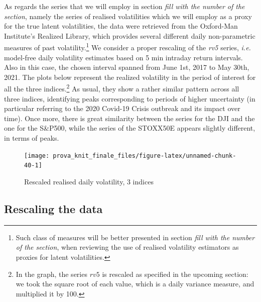 \documentclass[
]{book}
\theoremstyle{break}
\theoremstyle{nonumberplain}
\begin{document}
As regards the series that we will employ in section
\textit{fill with the number of the section}, namely the series of
realised volatilities which we will employ as a proxy for the true
latent volatilities, the data were retrieved from the Oxford-Man
Institute's Realized Library, which provides several different daily
non-parametric measures of past
volatility.\footnote{Such class of measures will be better presented in section \textit{fill with the number of the section}, when reviewing the use of realised volatility estimators as proxies for latent volatilities.}
We consider a proper rescaling of the \textit{rv5} series, \textit{i.e.}
model-free daily volatility estimates based on 5 min intraday return
intervals. Also in this case, the chosen interval spanned from June 1st,
2017 to May 30th, 2021. The plots below represent the realized
volatility in the period of interest for all the three
indices.\footnote{In the graph, the series $rv5$ is rescaled as specified in the upcoming section: we took the square root of each value, which is a daily variance measure, and multiplied it by 100.}
As usual, they show a rather similar pattern across all three indices,
identifying peaks corresponding to periods of higher uncertainty (in
particular referring to the 2020 Covid-19 Crisis outbreak and its impact
over time). Once more, there is great similarity between the series for
the DJI and the one for the S\&P500, while the series of the STOXX50E
appears slightly different, in terms of peaks.

\begin{figure}[H]

{\centering \texttt{[image: prova\_knit\_finale\_files/figure-latex/unnamed-chunk-40-1]} 

}

\caption{Rescaled realised daily volatility, 3 indices}\label{fig:unnamed-chunk-40}
\end{figure}

\subsection{Rescaling the data}
\end{document}
